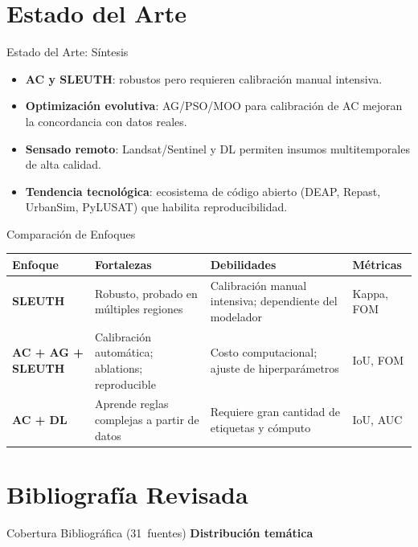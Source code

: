 \documentclass[aspectratio=169]{beamer}
\newcommand{\TotalRefs}{31}
\newcommand{\RefsCA}{10}
\newcommand{\RefsCalib}{6}
\newcommand{\RefsRS}{8}
\newcommand{\RefsImpacto}{4}
\newcommand{\RefsTools}{3}
\begin{document}
\section{Estado del Arte}
\begin{frame}{Estado del Arte: Síntesis}
  \begin{itemize}
    \item \textbf{AC y SLEUTH}: robustos pero requieren calibración manual intensiva.
    \item \textbf{Optimización evolutiva}: AG/PSO/MOO para calibración de AC mejoran la concordancia con datos reales.
    \item \textbf{Sensado remoto}: Landsat/Sentinel y DL permiten insumos multitemporales de alta calidad.
    \item \textbf{Tendencia tecnológica}: ecosistema de código abierto (DEAP, Repast, UrbanSim, PyLUSAT) que habilita reproducibilidad.
  \end{itemize}
\end{frame}

\begin{frame}{Comparación de Enfoques}
  \scriptsize
  \begin{tabularx}{\textwidth}{>{\bfseries}l X X >{\raggedright\arraybackslash}p{1.9cm}}
    \toprule
    Enfoque & Fortalezas & Debilidades & Métricas \\
    \midrule
    SLEUTH & Robusto, probado en múltiples regiones & Calibración manual intensiva; dependiente del modelador & Kappa, FOM \\
    AC + AG + SLEUTH & Calibración automática; ablations; reproducible & Costo computacional; ajuste de hiperparámetros & IoU, FOM \\
    AC + DL & Aprende reglas complejas a partir de datos & Requiere gran cantidad de etiquetas y cómputo & IoU, AUC \\
    \bottomrule
  \end{tabularx}
\end{frame}

\section{Bibliografía Revisada}
\begin{frame}{Cobertura Bibliográfica (\TotalRefs~fuentes)}
  \vspace{-0.6em}
      \textbf{Distribución temática}
      \vspace{0.3em}
      \begin{center}
      \end{center}
\end{frame}
\end{document}
